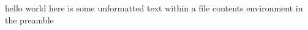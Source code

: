 \documentclass[a4paper]{article}
\begin{document}
	hello world
	here is
	some
	unformatted text
	within
	a file contents
	environment
	in the preamble
	
\end{document}
